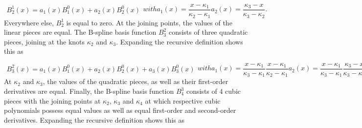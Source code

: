 \begin{subequations} \label{eq:Bspline-BF_21}
	\begin{align}
		B_2^1(x) = a_1(x) B_1^0(x) + a_2(x) B_2^0(x)
	\end{align}
	with
	\begin{equation}
		a_1(x) = \frac{x - \kappa_1}{\kappa_2 - \kappa_1} 
	\end{equation}
	\begin{equation}
		a_2(x) = \frac{\kappa_3 - x}{\kappa_3 - \kappa_2}. 
	\end{equation}
\end{subequations}
%
Everywhere else, $B_2^1$ is equal to zero. At the joining points, the values of the linear pieces are equal. The B-spline basis function $B_3^2$ consists of three quadratic pieces, joining at the knots $\kappa_2$ and $\kappa_3$. Expanding the recursive definition shows this as

\begin{subequations}
	\begin{align}
		B_3^2(x) = a_1(x) B_1^0(x) + a_2(x) B_2^0(x) + a_3(x) B_3^0(x)
	\end{align}
	with
	\begin{equation}
		a_1(x) = \frac{x-\kappa_1}{\kappa_3 - \kappa_1} \frac{x - \kappa_1}{\kappa_2 - \kappa_1}
	\end{equation}
	\begin{equation}
		a_2(x) = \frac{x - \kappa_1}{\kappa_3 - \kappa_1} \frac{\kappa_3 - x}{\kappa_3 - \kappa_2} + \frac{\kappa_4 - x}{\kappa_4 - \kappa_2} \frac{x - \kappa_2}{\kappa_3 - \kappa_2}
	\end{equation}
	\begin{equation}
		a_3(x) = \frac{\kappa_4 - x}{\kappa_4 - \kappa_2} \frac{\kappa_4 - x}{\kappa_4 - \kappa_3}.	
	\end{equation}
\end{subequations}
%
At $\kappa_2$ and $\kappa_3$, the values of the quadratic pieces, as well as their first-order derivatives are equal. Finally, the B-spline basis function $B_4^3$ consists of 4 cubic pieces with the joining points at $\kappa_2$, $\kappa_3$ and $\kappa_4$ at which respective cubic polynomials possess equal values as well as equal first-order and second-order derivatives. Expanding the recursive definition shows this as

